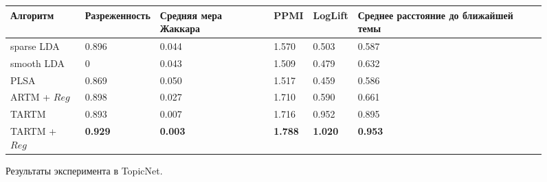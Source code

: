 \begin{figure*}[!h]
\begin{center}
    \begin{small}
    \begin{tabular}{ | p{2.8cm}| p{2.7cm} | p{2.5cm} | p{1.6cm} | p{1.5cm} | p{3.5cm} |}
    \hline
    Алгоритм & Разреженность & Средняя мера Жаккара & PPMI & LogLift & Среднее расстояние до ближайшей темы   \\ \hline
    sparse LDA    & 0.896 & 0.044 & 1.570 & 0.503 & 0.587\\ \hline
    smooth LDA    & 0     & 0.043 & 1.509 & 0.479 & 0.632\\ \hline
    PLSA          & 0.869 & 0.050 & 1.517 & 0.459 & 0.586\\ \hline
    ARTM + $Reg$  & 0.898 & 0.027 & 1.710 & 0.590 & 0.661 \\ \hline
    TARTM         & 0.893 & 0.007 & 1.716 & 0.952 & 0.895 \\ \hline
    TARTM + $Reg$ &\textbf{0.929} & \textbf{0.003} & \textbf{1.788} & \textbf{1.020} & \textbf{0.953} \\ \hline
    \end{tabular}
    \end{small}
\caption{Результаты эксперимента в TopicNet.}\end{center}
\end{figure*}

\clearpage
{}





